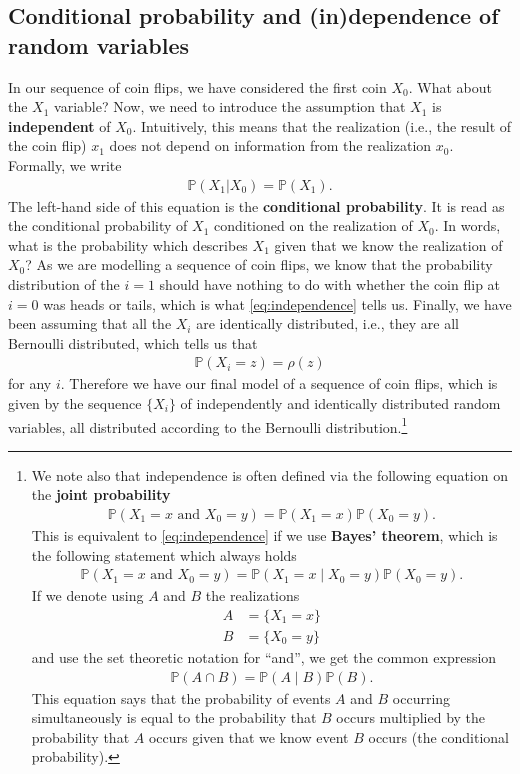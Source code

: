 \documentclass[11pt]{article}
\begin{document}
\subsection{Conditional probability and (in)dependence of random variables}
\label{sec:org275793a}
In our sequence of coin flips, we have considered the first coin \(X_{0}\). What
about the \(X_{1}\) variable? Now, we need to introduce the assumption that
\(X_{1}\) is \textbf{independent} of \(X_{0}\). Intuitively, this means that the
realization (i.e., the result of the coin flip) \(x_{1}\) does not depend on
information from the realization \(x_{0}\). Formally, we write
\begin{align}
\label{eq:independence}
\mathbb{P}(X_{1} | X_{0}) = \mathbb{P}(X_{1}).
\end{align}
The left-hand side of this equation is the \textbf{conditional probability}. It is read
as the conditional probability of \(X_{1}\) conditioned on the realization of
\(X_{0}\). In words, what is the probability which describes \(X_{1}\) given
that we know the realization of \(X_{0}\)? As we are modelling a sequence of
coin flips, we know that the probability distribution of the \(i=1\) should have
nothing to do with whether the coin flip at \(i = 0\) was heads or tails, which
is what \eqref{eq:independence} tells us. Finally, we have been assuming that all the
\(X_{i}\) are identically distributed, i.e., they are all Bernoulli distributed,
which tells us that
\begin{align*}
\mathbb{P}(X_{i} = z) = \rho(z)
\end{align*}
for any \(i\). Therefore we have our final model of a sequence of coin flips,
which is given by the sequence \(\{X_{i}\}\) of independently and identically
distributed random variables, all distributed according to the Bernoulli
distribution.\footnote{We note also that independence is often defined via the following equation on
the \textbf{joint probability}
\begin{align*}
\mathbb{P}(X_{1} = x\text{ and }X_{0} = y) = \mathbb{P}(X_{1} = x)\mathbb{P}(X_{0} = y).
\end{align*}
This is equivalent to \eqref{eq:independence} if we use \textbf{Bayes' theorem}, which
is the following statement which always holds
\begin{align*}
\mathbb{P}(X_{1} = x \text{ and } X_{0} = y) = \mathbb{P}(X_{1} = x \mid X_{0} = y)\mathbb{P}(X_{0} = y).
\end{align*}
If we denote using \(A\) and \(B\) the realizations
\begin{align*}
A &= \{X_{1} = x\} \\
B &= \{X_{0} = y\}
\end{align*}
and use the set theoretic notation for ``and'', we get the common expression
\begin{align*}
\mathbb{P}(A \cap B) = \mathbb{P}(A \mid B)\mathbb{P}(B).
\end{align*}
This equation says that the probability of events \(A\) and \(B\) occurring
simultaneously is equal to the probability that \(B\) occurs multiplied by the
probability that \(A\) occurs given that we know event \(B\) occurs (the
conditional probability).}
\end{document}
